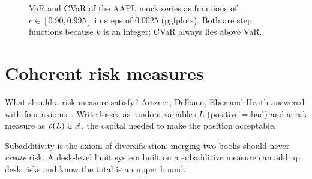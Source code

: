 \begin{figure}[htbp]
\centering
{}
\caption{VaR and CVaR of the AAPL mock series as functions of $c\in[0.90,0.995]$ in steps of $0.0025$ (pgfplots). Both are
step functions because $k$ is an integer; CVaR always lies above VaR.}
\label{fig:varcurve}
\end{figure}

\section{Coherent risk measures}\label{sec:es}
What should a risk measure satisfy? Artzner, Delbaen, Eber and Heath answered with four axioms~\cite{artzner1999coherent}.
Write losses as random variables $L$ (positive = bad) and a risk measure as $\rho(L)\in\mathbb{R}$, the capital needed to make
the position acceptable.


Subadditivity is the axiom of diversification: merging two books should never \emph{create} risk. A desk-level limit
system built on a subadditive measure can add up desk risks and know the total is an upper bound.

